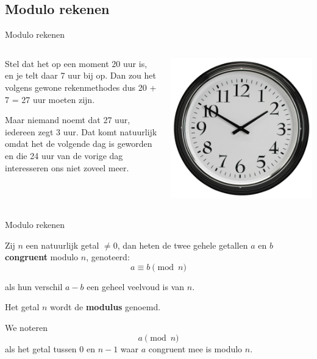 \documentclass{beamer}
\begin{document}
\subsection{Modulo rekenen}
\begin{frame}{Modulo rekenen}
	\begin{columns}
		\begin{column}[T]{0.5\textwidth}
			Stel dat het op een moment 20 uur is, en je telt daar 7 uur bij op. Dan zou het volgens gewone rekenmethodes dus 20 + 7 = 27 uur moeten zijn.
			
			Maar niemand noemt dat 27 uur, iedereen zegt 3 uur. Dat komt natuurlijk omdat het de volgende dag is geworden en die 24 uur van de vorige dag interesseren ons niet zoveel meer.
		\end{column}
		
		\begin{column}[T]{0.5\textwidth}
				\includegraphics[width=\textwidth]{img/clock.jpg}
		\end{column}
	\end{columns}
\end{frame}

\begin{frame}{Modulo rekenen}

	Zij $n$ een natuurlijk getal $\neq 0$, dan heten de twee gehele getallen $a$ en $b$ \textbf{congruent} modulo $n$, genoteerd:
	\[ 
		a \equiv b \pmod{n}
	\]
	
	als hun verschil $a - b$ een geheel veelvoud is van $n$.
	
	Het getal $n$ wordt de \textbf{modulus} genoemd.
	
	We noteren 
	\[
	a \pmod{n} 
	\]
	als het getal tussen $0$ en $n-1$ waar $a$ congruent mee is modulo $n$.
	
\end{frame}
\end{document}
